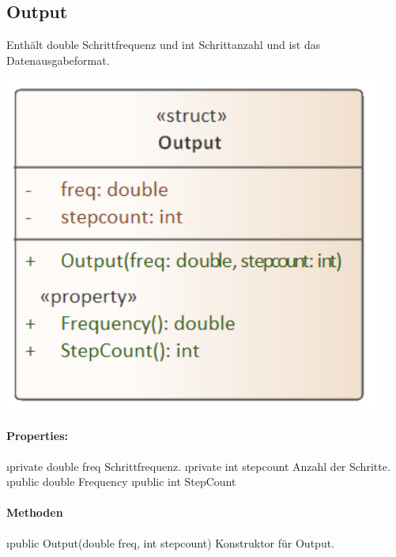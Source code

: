 \documentclass[../entwurf.tex]{subfiles}
\begin{document}
    \subsection{Output}
        Enthält double Schrittfrequenz und int Schrittanzahl und ist das Datenausgabeformat.
        \begin{center}
            \includegraphics[page=1,width=350pt,keepaspectratio]{../uml_klassen/StepDetectionLib/Output.png}
        \end{center}
        \paragraph{Properties:}
        \begin{itemize}
            \i{private double freq} Schrittfrequenz.
            \i{private int stepcount} Anzahl der Schritte.
            \i{public double Frequency} 
            \i{public int StepCount} 
        \end{itemize}
        \paragraph{Methoden}
        \begin{itemize}
            \i{public Output(double freq, int stepcount)} Konstruktor für Output.
        \end{itemize}


                        
\end{document}
